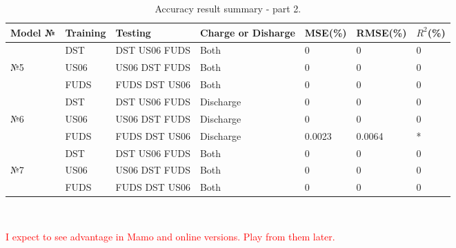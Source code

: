 \begin{center}
    \begin{table}[htbp]
\begin{tabular}{ p{1.5cm} p{1.5cm} p{1.5cm} p{2.0cm} p{2.0cm} p{2.0cm} p{2.0cm} }
    \hline
    Model № & Training  & Testing & Charge or Disharge & MSE(\%) & RMSE(\%) & $R^{2}$(\%) \\
    \hline
     & DST  & DST US06 FUDS & Both & 0 & 0 & 0 \\
    №5%
     & US06 & US06 DST FUDS & Both & 0 & 0 & 0 \\
     & FUDS & FUDS DST US06 & Both & 0 & 0 & 0 \\
    \hline
     & DST  & DST US06 FUDS & Discharge & 0 & 0 & 0 \\
    №6%
     & US06 & US06 DST FUDS & Discharge & 0 & 0 & 0 \\
     & FUDS & FUDS DST US06 & Discharge & 0.0023 & 0.0064 & * \\
    \hline
     & DST  & DST US06 FUDS & Both & 0 & 0 & 0 \\
    №7%
     & US06 & US06 DST FUDS & Both & 0 & 0 & 0 \\
     & FUDS & FUDS DST US06 & Both & 0 & 0 & 0 \\
    \hline
\end{tabular} \\
\caption{Accuracy result summary - part 2.}
\label{tab:acc-results2}
    \end{table}
\end{center}
\textcolor{red}{I expect to see advantage in Mamo and online versions. Play from them later.}
